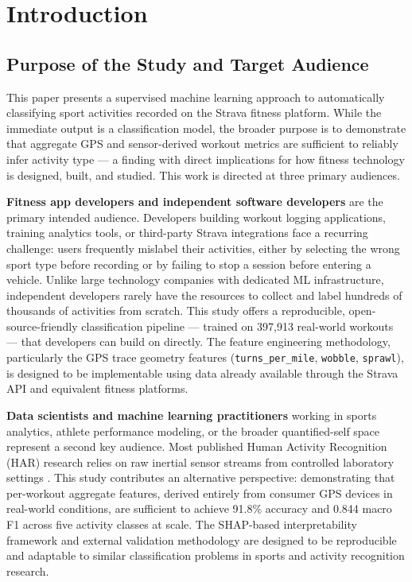 \documentclass[11pt, onecolumn]{article}
\begin{document}
\section{Introduction}

\subsection{Purpose of the Study and Target Audience}

This paper presents a supervised machine learning approach to automatically 
classifying sport activities recorded on the Strava fitness platform. While the 
immediate output is a classification model, the broader purpose is to demonstrate 
that aggregate GPS and sensor-derived workout metrics are sufficient to reliably 
infer activity type --- a finding with direct implications for how fitness 
technology is designed, built, and studied. This work is directed at three 
primary audiences.

\textbf{Fitness app developers and independent software developers} are the 
primary intended audience. Developers building workout logging applications, 
training analytics tools, or third-party Strava integrations face a recurring 
challenge: users frequently mislabel their activities, either by selecting the 
wrong sport type before recording or by failing to stop a session before entering 
a vehicle. Unlike large technology companies with dedicated ML infrastructure, 
independent developers rarely have the resources to collect and label hundreds of 
thousands of activities from scratch. This study offers a reproducible, 
open-source-friendly classification pipeline --- trained on 397,913 real-world 
workouts --- that developers can build on directly. The feature engineering 
methodology, particularly the GPS trace geometry features (\texttt{turns\_per\_mile}, 
\texttt{wobble}, \texttt{sprawl}), is designed to be implementable using data 
already available through the Strava API and equivalent fitness platforms.

\textbf{Data scientists and machine learning practitioners} working in sports 
analytics, athlete performance modeling, or the broader quantified-self space 
represent a second key audience. Most published Human Activity Recognition (HAR) 
research relies on raw inertial sensor streams from controlled laboratory 
settings \citep{attal2015}. This study contributes an alternative perspective: 
demonstrating that per-workout aggregate features, derived entirely from 
consumer GPS devices in real-world conditions, are sufficient to achieve 91.8\% 
accuracy and 0.844 macro F1 across five activity classes at scale. The SHAP-based 
interpretability framework and external validation methodology are designed to be 
reproducible and adaptable to similar classification problems in sports and 
activity recognition research.
\end{document}
